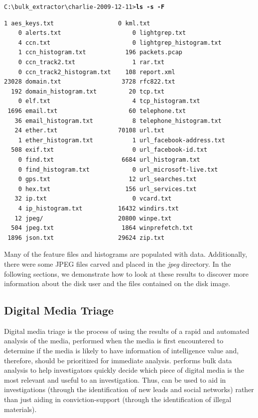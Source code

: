 \begingroup
\footnotesize
\texttt{C:\textbackslash bulk\_extractor\textbackslash charlie-2009-12-11\textgreater \textbf{ls -s -F}}
\endgroup
\begingroup
\footnotesize
\begin{Verbatim}[fontfamily=courier, commandchars=\\\{\}]
    1 aes_keys.txt                  0 kml.txt
    0 alerts.txt                    0 lightgrep.txt
    4 ccn.txt                       0 lightgrep_histogram.txt
    1 ccn_histogram.txt           196 packets.pcap
    0 ccn_track2.txt                1 rar.txt
    0 ccn_track2_histogram.txt    108 report.xml
23028 domain.txt                 3728 rfc822.txt
  192 domain_histogram.txt         20 tcp.txt
    0 elf.txt                       4 tcp_histogram.txt
 1696 email.txt                    60 telephone.txt
   36 email_histogram.txt           8 telephone_histogram.txt
   24 ether.txt                 70108 url.txt
    1 ether_histogram.txt           1 url_facebook-address.txt
  508 exif.txt                      0 url_facebook-id.txt
    0 find.txt                   6684 url_histogram.txt
    0 find_histogram.txt            0 url_microsoft-live.txt
    0 gps.txt                      12 url_searches.txt
    0 hex.txt                     156 url_services.txt
   32 ip.txt                        0 vcard.txt
    4 ip_histogram.txt          16432 windirs.txt
   12 jpeg/                     20800 winpe.txt
  504 jpeg.txt                   1864 winprefetch.txt
 1896 json.txt                  29624 zip.txt
\end{Verbatim}
\endgroup
Many of the feature files and histograms are populated with data. Additionally, there were some JPEG files carved and placed in the \textit{jpeg} directory. In the following sections, we demonstrate how to look at these results to discover more information about the disk user and the files contained on the disk image.

\subsection{Digital Media Triage}
Digital media triage is the process of using the results of a rapid and automated analysis of the media, performed when the media is first encountered to determine if the media is likely to have information of intelligence value and, therefore, should be prioritized for immediate analysis. \bulk performs bulk data analysis to help investigators quickly decide which piece of digital media is the most relevant and useful to an investigation. Thus, \bulk can be used to aid in investigations (through the identification of new leads and social networks) rather than just aiding in conviction-support (through the identification of illegal materials)\cite{digitalmediatriage}.\\

